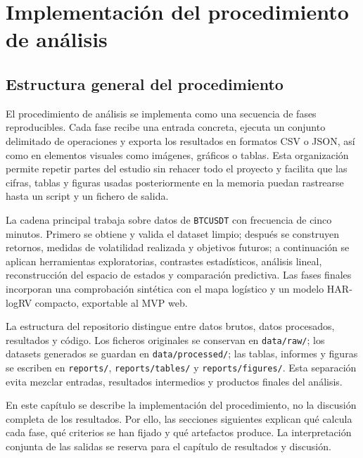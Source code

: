 
\chapter{Implementación del procedimiento de análisis}\label{cap:implementacion-procedimiento}

\section{Estructura general del procedimiento}\label{sec:estructura-procedimiento}

El procedimiento de análisis se implementa como una secuencia de fases reproducibles. Cada fase recibe una entrada concreta, ejecuta un conjunto delimitado de operaciones y exporta los resultados en formatos CSV o JSON, así como en elementos visuales como imágenes, gráficos o tablas. Esta organización permite repetir partes del estudio sin rehacer todo el proyecto y facilita que las cifras, tablas y figuras usadas posteriormente en la memoria puedan rastrearse hasta un script y un fichero de salida.

La cadena principal trabaja sobre datos de \texttt{BTCUSDT} con frecuencia de cinco minutos. Primero se obtiene y valida el dataset limpio; después se construyen retornos, medidas de volatilidad realizada y objetivos futuros; a continuación se aplican herramientas exploratorias, contrastes estadísticos, análisis lineal, reconstrucción del espacio de estados y comparación predictiva. Las fases finales incorporan una comprobación sintética con el mapa logístico y un modelo HAR-logRV compacto, exportable al MVP web.

La estructura del repositorio distingue entre datos brutos, datos procesados, resultados y código. Los ficheros originales se conservan en \texttt{data/\allowbreak raw/}; los datasets generados se guardan en \texttt{data/\allowbreak processed/}; las tablas, informes y figuras se escriben en \texttt{reports/}, \texttt{reports/\allowbreak tables/} y \texttt{reports/\allowbreak figures/}. Esta separación evita mezclar entradas, resultados intermedios y productos finales del análisis.

En este capítulo se describe la implementación del procedimiento, no la discusión completa de los resultados. Por ello, las secciones siguientes explican qué calcula cada fase, qué criterios se han fijado y qué artefactos produce. La interpretación conjunta de las salidas se reserva para el capítulo de resultados y discusión.

